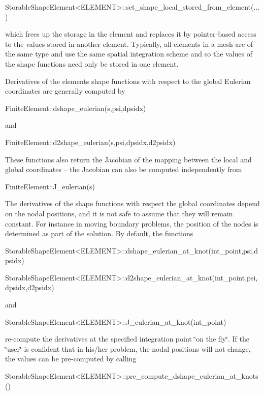 \begin{DoxyCode}
StorableShapeElement<ELEMENT>::set\_shape\_local\_stored\_from\_element(...)
\end{DoxyCode}
 which frees up the storage in the element and replaces it by pointer-\/based access to the values stored in another element. Typically, all elements in a mesh are of the same type and use the same spatial integration scheme and so the values of the shape functions need only be stored in one element.

Derivatives of the element\textquotesingle{}s shape functions with respect to the global Eulerian coordinates are generally computed by 
\begin{DoxyCode}
FiniteElement::dshape\_eulerian(s,psi,dpsidx)
\end{DoxyCode}
 and 
\begin{DoxyCode}
FiniteElement::d2shape\_eulerian(s,psi,dpsidx,d2psidx)
\end{DoxyCode}
 These functions also return the Jacobian of the mapping between the local and global coordinates -- the Jacobian can also be computed independently from 
\begin{DoxyCode}
FiniteElement::J\_eulerian(s)
\end{DoxyCode}
 The derivatives of the shape functions with respect the global coordinates depend on the nodal positions, and it is not safe to assume that they will remain constant. For instance in moving boundary problems, the position of the nodes is determined as part of the solution. By default, the functions 
\begin{DoxyCode}
StorableShapeElement<ELEMENT>::dshape\_eulerian\_at\_knot(int\_point,psi,dpsidx)
\end{DoxyCode}
 
\begin{DoxyCode}
StorableShapeElement<ELEMENT>::d2shape\_eulerian\_at\_knot(int\_point,psi,dpsidx,d2psidx)
\end{DoxyCode}
 and 
\begin{DoxyCode}
StorableShapeElement<ELEMENT>::J\_eulerian\_at\_knot(int\_point)
\end{DoxyCode}
 re-\/compute the derivatives at the specified integration point \char`\"{}on the fly\char`\"{}. If the \char`\"{}user\char`\"{} is confident that in his/her problem, the nodal positions will not change, the values can be pre-\/computed by calling 
\begin{DoxyCode}
StorableShapeElement<ELEMENT>::pre\_compute\_dshape\_eulerian\_at\_knots()
\end{DoxyCode}
 
